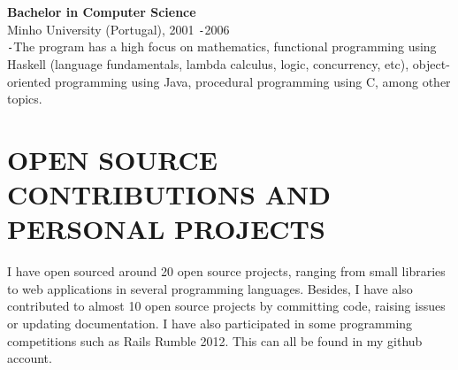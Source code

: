 \documentclass{res}
\def\Minus{\texttt{-}}
\begin{document}
\begin{resume}
    {\bf Bachelor in Computer Science}\\
    Minho University (Portugal), 2001 \Minus 2006\\
    \Minus The program has a high focus on mathematics, functional programming using Haskell (language fundamentals, lambda calculus, logic, concurrency, etc), object-oriented programming using Java, procedural programming using C, among other topics.


\section{OPEN SOURCE CONTRIBUTIONS AND PERSONAL PROJECTS}
\vspace{0.1in}

    I have open sourced around 20 open source projects, ranging from small libraries to web applications in several programming languages. Besides, I have also contributed to almost 10 open source projects by committing code, raising issues or updating documentation. I have also participated in some programming competitions such as Rails Rumble 2012. This can all be found in my github account.

\end{resume}
\end{document}
